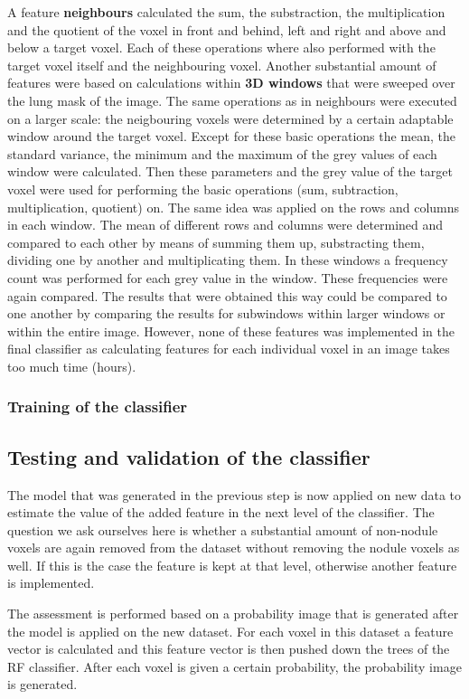 A feature \textbf{neighbours} calculated the sum, the substraction, the
multiplication and the quotient of the voxel in front and behind, left and right
and above and below a target voxel. Each of these operations where also
performed with the target voxel itself and the neighbouring voxel. Another
substantial amount of features were based on calculations within \textbf{3D
windows} that were sweeped over the lung mask of the image. The same operations
as in neighbours were executed on a larger scale: the neigbouring voxels
were determined by a certain adaptable window around the target voxel. Except
for these basic operations the mean, the standard variance, the minimum and the
maximum of the grey values of each window were calculated. Then these parameters
and the grey value of the target voxel were used for performing the basic
operations (sum, subtraction, multiplication, quotient) on. The same idea was
applied on the rows and columns in each window. The mean of different rows and
columns were determined and compared to each other by means of summing them up,
substracting them, dividing one by another and multiplicating them. In these
windows a frequency count was performed for each grey value in the window. These
frequencies were again compared. The results that were obtained this way could
be compared to one another by comparing the results for subwindows within larger
windows or within the entire image. However, none of these features was
implemented in the final classifier as calculating features for each
individual voxel in an image takes too much time (hours).

\subsubsection{Training of the classifier}


\subsection{Testing and validation of the classifier}
The model that was generated in the previous step is now applied on new data
to estimate the value of the added feature in the next level of the
classifier.
The question we ask ourselves here is whether a substantial amount of
non-nodule voxels are again removed from the dataset without removing the nodule
voxels as well. If this is the case the feature is kept at that level, otherwise
another feature is implemented.

The assessment is performed based on a probability image that is generated after
the model is applied on the new dataset. For each voxel in this dataset a
feature vector is calculated and this feature vector is then pushed down the
trees of the RF classifier. After each voxel is given a certain probability, the
probability image is generated.


